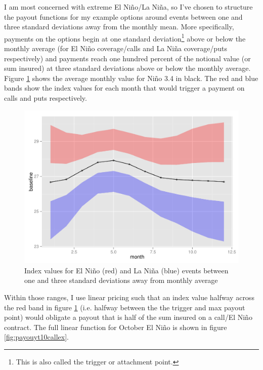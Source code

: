 \documentclass[authoryear]{article}
\begin{document}
I am most concerned with extreme El Ni\~no/La Ni\~na, so I've chosen to structure the payout functions for my example options around events between one and three standard deviations away from the monthly mean. More specifically, payments on the options begin at one standard deviation\footnote{This is also called the trigger or attachment point.} above or below the monthly average (for El Ni\~no coverage/calls and La Ni\~na coverage/puts respectively) and payments reach one hundred percent of the notional value (or sum insured) at three standard deviations above or below the monthly average. Figure \ref{fig:optionParamsByMonth} shows the average monthly value for Ni\~no 3.4 in black. The red and blue bands show the index values for each month that would trigger a payment on calls and puts respectively. 

\begin{figure}[!htbp]
  \includegraphics[width=\linewidth]{Pricingfigs/optionParamsByMonth}
  \caption{Index values for El Ni\~no (red) and La Ni\~na (blue) events between one and three standard deviations away from monthly average}
   \label{fig:optionParamsByMonth}
\end{figure}

Within those ranges, I use linear pricing such that an index value halfway across the red band in figure \ref{fig:optionParamsByMonth} (i.e. halfway between the the trigger and max payout point) would obligate a payout that is half of the sum insured on a call/El Ni\~no contract. The full linear function for October El Ni\~no is shown in figure \ref{fig:payouyt10callex}. 
\end{document}
